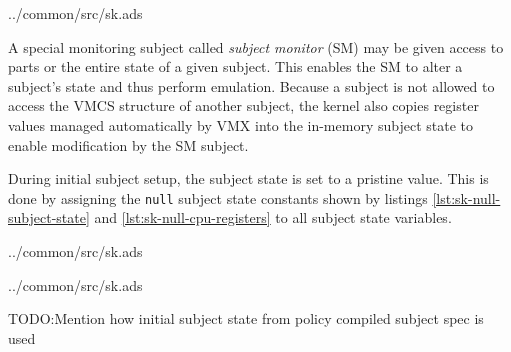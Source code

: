 
	{../common/src/sk.ads}

A special monitoring subject called \emph{subject monitor} (SM) may be given access to parts or the entire state of a
given subject. This enables the SM to alter a subject's state and thus perform
emulation. Because a subject is not allowed to access the VMCS structure of
another subject, the kernel also copies register values managed automatically by
VMX into the in-memory subject state to enable modification by the SM
subject.

During initial subject setup, the subject state is set to a pristine value. This
is done by assigning the \texttt{null} subject state constants shown by listings
\ref{lst:sk-null-subject-state} and \ref{lst:sk-null-cpu-registers} to all
subject state variables.


	{../common/src/sk.ads}


	{../common/src/sk.ads}

TODO:Mention how initial subject state from policy compiled subject spec is used
